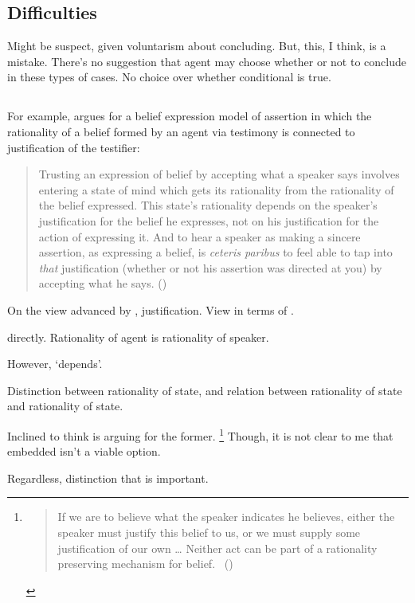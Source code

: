 \subsection{Difficulties}
\label{sec:qwhyv-subs-paragr}

\begin{note}
  Might be suspect, given voluntarism about concluding.
  But, this, I think, is a mistake.
  There's no suggestion that agent may choose whether or not to conclude in these types of cases.
  No choice over whether conditional is true.
\end{note}

\subsection{\citeauthor{Owens:2006tw}}

\begin{note}
  For example, \citeauthor{Owens:2006tw} argues for a belief expression model of assertion in which the rationality of a belief formed by an agent via testimony is connected to justification of the testifier:

  \begin{quote}
    Trusting an expression of belief by accepting what a speaker says involves entering a state of mind which gets its rationality from the rationality of the belief expressed.
    This state's rationality depends on the speaker's justification for the belief he expresses, not on his justification for the action of expressing it.
    And to hear a speaker as making a sincere assertion, as expressing a belief, is \emph{ceteris paribus} to feel able to tap into \emph{that} justification (whether or not his assertion was directed at you) by accepting what he says.%
    \mbox{}\hfill\mbox{(\citeyear[123]{Owens:2006tw})}
  \end{quote}

  On the view advanced by \citeauthor{Owens:2006tw}, justification.
  View in terms of \support{}.

  \support{} directly.
  Rationality of agent is rationality of speaker.

  However, `depends'.

  Distinction between rationality of state, and relation between rationality of state and rationality of state.

  Inclined to think \citeauthor{Owens:2006tw} is arguing for the former.%
  \footnote{
    \begin{quote}
      If we are to believe what the speaker indicates he believes, either the speaker must justify this belief to us, or we must supply some justification of our own
      \dots
      Neither act can be part of a rationality preserving mechanism for belief.%
      \mbox{ }\hfill\mbox{(\citeyear[123--124]{Owens:2006tw})}
    \end{quote}
  }
  Though, it is not clear to me that embedded isn't a viable option.

  Regardless, distinction that is important.
\end{note}

